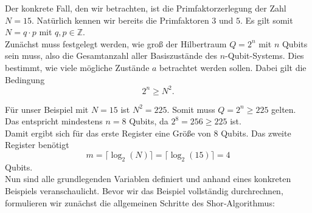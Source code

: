 Der konkrete Fall, den wir betrachten, ist die Primfaktorzerlegung der Zahl \( N = 15 \). Natürlich kennen wir bereits die Primfaktoren \( 3 \) und \( 5 \). Es gilt somit \( N = q \cdot p \) mit \( q, p \in \mathbb{Z} \). \\

Zunächst muss festgelegt werden, wie groß der Hilbertraum \( Q = 2^n \) mit \( n \) Qubits sein muss, also die Gesamtanzahl aller Basiszustände des \( n \)-Qubit-Systems. Dies bestimmt, wie viele mögliche Zustände \( a \) betrachtet werden sollen. Dabei gilt die Bedingung
\[
2^n \geq N^2.
\]

Für unser Beispiel mit \( N = 15 \) ist \( N^2 = 225 \). Somit muss \( Q = 2^n \geq 225 \) gelten. Das entspricht mindestens \( n = 8 \) Qubits, da \( 2^8 = 256 \geq 225 \) ist. \\

Damit ergibt sich für das erste Register eine Größe von \( 8 \) Qubits. Das zweite Register benötigt
\[
m = \lceil \log_2(N) \rceil = \lceil \log_2(15) \rceil = 4
\]
Qubits.\\

Nun sind alle grundlegenden Variablen definiert und anhand eines konkreten Beispiels veranschaulicht. 
Bevor wir das Beispiel vollständig durchrechnen, formulieren wir zunächst die allgemeinen Schritte des Shor‑Algorithmus:

